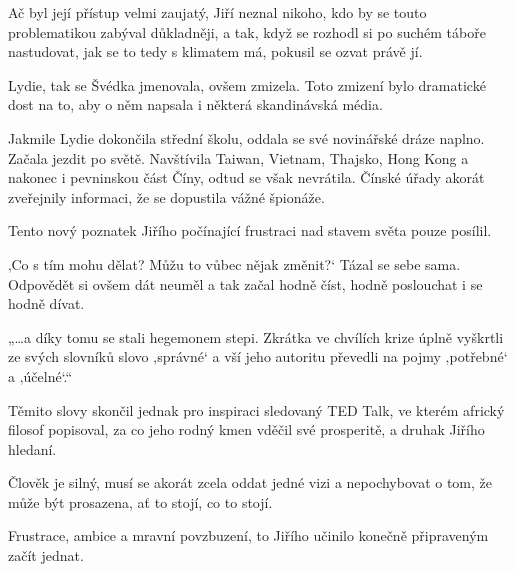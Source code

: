 Ač byl její přístup velmi zaujatý, Jiří neznal nikoho, kdo by se touto problematikou zabýval důkladněji, a tak, když se rozhodl si po suchém táboře nastudovat, jak se to tedy s klimatem má, pokusil se ozvat právě jí.

Lydie, tak se Švédka jmenovala, ovšem zmizela. Toto zmizení bylo dramatické dost na to, aby o něm napsala i některá skandinávská média. 

Jakmile Lydie dokončila střední školu, oddala se své novinářské dráze naplno. Začala jezdit po světě. Navštívila Taiwan, Vietnam, Thajsko, Hong Kong a nakonec i pevninskou část Číny, odtud se však nevrátila. Čínské úřady akorát zveřejnily informaci, že se dopustila vážné špionáže.

Tento nový poznatek Jiřího počínající frustraci nad stavem světa pouze posílil.

‚Co s tím mohu dělat? Můžu to vůbec nějak změnit?‘ Tázal se sebe sama. Odpovědět si ovšem dát neuměl a tak začal hodně číst, hodně poslouchat i se hodně dívat.

„…a díky tomu se stali hegemonem stepi. Zkrátka ve chvílích krize úplně vyškrtli ze svých slovníků slovo ‚správné‘ a vší jeho autoritu převedli na pojmy ‚potřebné‘ a ‚účelné‘.“

Těmito slovy skončil jednak pro inspiraci sledovaný TED Talk, ve kterém africký filosof popisoval, za co jeho rodný kmen vděčil své prosperitě, a druhak Jiřího hledaní.  

Člověk je silný, musí se akorát zcela oddat jedné vizi a nepochybovat o tom, že může být prosazena, ať to stojí, co to stojí.

Frustrace, ambice a mravní povzbuzení, to Jiřího učinilo konečně připraveným začít jednat.
